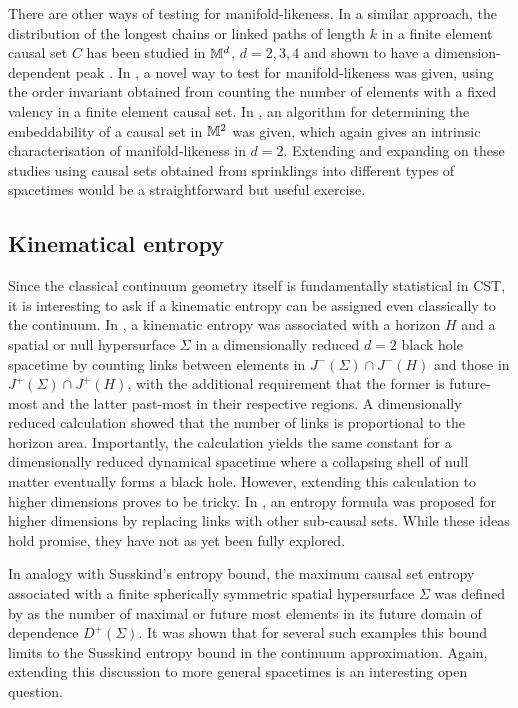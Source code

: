 There are other ways of testing for manifold-likeness.  In a similar approach, the distribution of the longest  chains or linked paths of length $k$ in a finite element causal set $C$ has been
studied in $\mathbb M^d$, $d=2,3,4$ and shown to have a dimension-dependent peak \citep{bomemad}. 
 In \cite{nodedegree},  a novel way to test for manifold-likeness was given, using the order invariant obtained from counting
 the number of elements with a fixed valency  in a finite
element causal set. In   \cite{joeinterval},  an  algorithm for  determining  the  embeddability of a causal set in
$\mathbb M^2$ was given,  which
again gives an intrinsic characterisation of manifold-likeness in $d=2$. Extending and expanding on these studies using
causal sets obtained from sprinklings into different types of spacetimes would be a straightforward but useful exercise.      

\subsection{Kinematical entropy} 
\label{ssec:kinent}

Since the classical continuum geometry itself is fundamentally statistical in CST, it is interesting to ask if a
kinematic 
entropy can be assigned even classically to the continuum. In \cite{dousorkin},  a kinematic entropy was associated
with a horizon $H$ and a  spatial or null hypersurface $\Sigma$ in a  dimensionally reduced $d=2$ black hole spacetime by counting links between 
elements in $J^-(\Sigma) \cap J^-(H)$ and those in $J^+(\Sigma) \cap J^+(H)$, with the additional requirement that the
former is future-most and the latter past-most in their respective regions. A dimensionally reduced calculation showed that the number of
links is proportional to the horizon area. Importantly, the  calculation yields the same
constant for a dimensionally reduced dynamical spacetime where  a collapsing shell of null matter eventually forms a
black hole. However, extending this calculation  to higher dimensions proves to be  tricky.  In \cite{sarahthesis}, an entropy
formula was proposed for higher dimensions by replacing links with other sub-causal sets. While these ideas  hold
promise, they  have not as yet been fully explored. 

In analogy with Susskind's entropy bound,  the
maximum causal set entropy  associated with a finite
spherically symmetric spatial hypersurface $\Sigma$  was defined by \cite{rz} as the number of maximal or future most elements
in its future domain of dependence $D^+(\Sigma)$. It was shown  that for several such examples this bound
limits to the Susskind entropy bound in the continuum approximation. Again, extending this discussion to more general
spacetimes is an interesting open question. 

